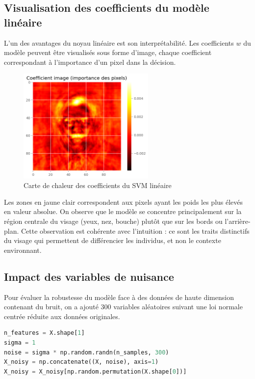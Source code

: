 \documentclass[11pt,a4paper]{article}
\begin{document}
\subsection{Visualisation des coefficients du modèle linéaire}

L'un des avantages du noyau linéaire est son interprétabilité. Les coefficients $w$ du modèle peuvent être visualisés sous forme d'image, chaque coefficient correspondant à l'importance d'un pixel dans la décision.

\begin{figure}[H]
\centering
\includegraphics[width=0.6\textwidth]{images/4.png}
\caption{Carte de chaleur des coefficients du SVM linéaire}
\end{figure}

Les zones en jaune clair correspondent aux pixels ayant les poids les plus élevés en valeur absolue. On observe que le modèle se concentre principalement sur la région centrale du visage (yeux, nez, bouche) plutôt que sur les bords ou l'arrière-plan. Cette observation est cohérente avec l'intuition : ce sont les traits distinctifs du visage qui permettent de différencier les individus, et non le contexte environnant.

\subsection{Impact des variables de nuisance}

Pour évaluer la robustesse du modèle face à des données de haute dimension contenant du bruit, on a ajouté 300 variables aléatoires suivant une loi normale centrée réduite aux données originales.

\begin{lstlisting}[language=Python, caption=Ajout de variables de nuisance]
n_features = X.shape[1]
sigma = 1
noise = sigma * np.random.randn(n_samples, 300)
X_noisy = np.concatenate((X, noise), axis=1)
X_noisy = X_noisy[np.random.permutation(X.shape[0])]
\end{lstlisting}
\end{document}
